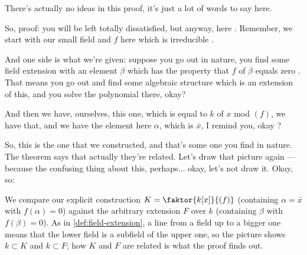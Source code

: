 \begin{proofWrapper}

\begin{speech}[01:25:10 - 01:26:22]
There's actually no ideas in this proof, it's just a lot of words to say here.

So, proof: you will be left totally dissatisfied, but anyway, here . Remember, we start with our small field and $f$ here which is irreducible .

And one side is what we're given: suppose you go out in nature, you find some field extension with an element $\beta$ which has the property that $f$ of $\beta$ equals zero . That means you go out and find some algebraic structure which is an extension of this, and you solve the polynomial there, okay?

And then we have, ourselves, this one, which is equal to $k$ of $x$ mod $(f)$, we have that, and we have the element here $\alpha$, which is $\bar{x}$, I remind you, okay ?

So, this is the one that we constructed, and that's some one you find in nature. The theorem says that actually they're related. Let's draw that picture again --- because the confusing thing about this, perhaps... okay, let's not draw it. Okay, so:
\end{speech}

\begin{content}
We compare our explicit construction $K = \faktor{k[x]}{(f)}$ (containing $\alpha = \bar{x}$ with $f(\alpha) = 0$) against the arbitrary extension $F$ over $k$ (containing $\beta$ with $f(\beta) = 0$). As in \cref{def:field-extension}, a line from a field up to a bigger one means that the lower field is a subfield of the upper one, so the picture shows $k \subset K$ and $k \subset F$; how $K$ and $F$ are related is what the proof finds out.


\end{content}
\end{proofWrapper}
